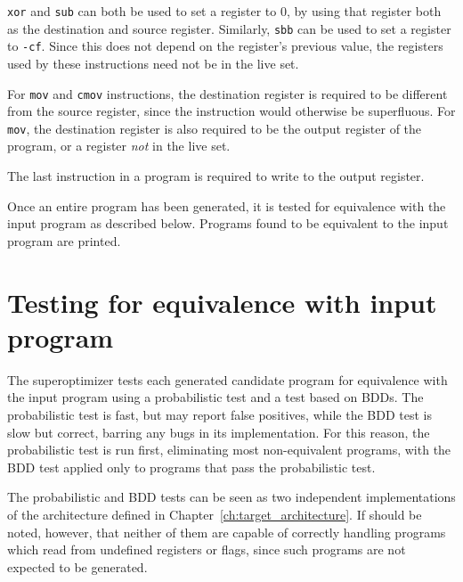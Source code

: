 \documentclass[a4paper,11pt]{kth-mag}
\begin{document}

\verb|xor| and \verb|sub| can both be used to set a register to 0, by using that register both as the destination and source register.
Similarly, \verb|sbb| can be used to set a register to \verb|-cf|.
Since this does not depend on the register's previous value, the registers used by these instructions need not be in the live set.

For \verb|mov| and \verb|cmov| instructions, the destination register is required to be different from the source register, since the instruction would otherwise be superfluous.
For \verb|mov|, the destination register is also required to be the output register of the program, or a register \emph{not} in the live set.

The last instruction in a program is required to write to the output register.

Once an entire program has been generated, it is tested for equivalence with the input program as described below.
Programs found to be equivalent to the input program are printed.


\section{Testing for equivalence with input program} %


The superoptimizer tests each generated candidate program for equivalence with the input program using a probabilistic test and a test based on BDDs.
The probabilistic test is fast, but may report false positives, while the BDD test is slow but correct, barring any bugs in its implementation.
For this reason, the probabilistic test is run first, eliminating most non-equivalent programs, with the BDD test applied only to programs that pass the probabilistic test.

The probabilistic and BDD tests can be seen as two independent implementations of the architecture defined in Chapter~\ref{ch:target_architecture}.
If should be noted, however, that neither of them are capable of correctly handling programs which read from undefined registers or flags, since such programs are not expected to be generated.
\end{document}
